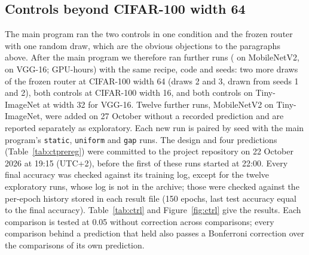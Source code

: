 \documentclass[10pt,a4paper]{article}
\begin{document}
\begin{table}[!htbp]\centering\small
\caption{Routing controls on CIFAR-100 at width 64, three backbones,
paired by seed.}
\label{tab:mbw64}
\end{table}

\subsection{Controls beyond CIFAR-100 width 64}\label{sec:ctrl}

The main program ran the two controls in one condition and the frozen
router with one random draw, which are the obvious objections to the
paragraphs above. After the main program we therefore ran 
further runs ( on MobileNetV2,  on VGG-16;
 GPU-hours) with the same recipe, code and seeds: two more draws of
the frozen router at CIFAR-100 width 64 (draws 2 and 3, drawn from seeds 1
and 2), both controls at CIFAR-100 width 16, and both controls on
Tiny-ImageNet at width 32 for VGG-16. Twelve further runs, MobileNetV2 on
Tiny-ImageNet, were added on 27 October without a recorded prediction and are
reported separately as exploratory. Each new run is paired by seed with the main
program's \texttt{static}, \texttt{uniform} and \texttt{gap} runs. The design
and four predictions (Table~\ref{tab:ctprereg}) were committed to the
project repository on 22 October 2026 at 19:15 (UTC+2), before the first of
these runs started at 22:00. Every final accuracy was checked against its
training log, except for the twelve exploratory runs, whose log is not in the
archive; those were checked against the per-epoch history stored in each
result file (150 epochs, last test accuracy equal to the final accuracy). Table~\ref{tab:ctrl} and Figure~\ref{fig:ctrl} give the
results. Each comparison is tested at 0.05 without correction across
comparisons; every comparison behind a prediction that held also passes a
Bonferroni correction over the comparisons of its own prediction.
\end{document}
